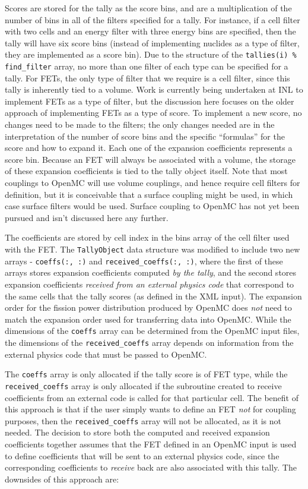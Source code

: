 \documentclass[10pt]{article}
\numberwithin{equation}{section} %
\begin{document}
Scores are stored for the tally as the score bins, and are a multiplication of the number of bins in all of the filters specified for a tally. For instance, if a cell filter with two cells and an energy filter with three energy bins are specified, then the tally will have six score bins (instead of implementing nuclides as a type of filter, they are implemented as a score bin). Due to the structure of the {\tt tallies(i) \% find\_filter} array, no more than one filter of each type can be specified for a tally. For FETs, the only type of filter that we require is a cell filter, since this tally is inherently tied to a volume. Work is currently being undertaken at INL to implement FETs as a type of filter, but the discussion here focuses on the older approach of implementing FETs as a type of score. To implement a new score, no changes need to be made to the filters; the only changes needed are in the interpretation of the number of score bins and the specific ``formulas'' for the score and how to expand it. Each one of the expansion coefficients represents a score bin. Because an FET will always be associated with a volume, the storage of these expansion coefficients is tied to the tally object itself. Note that most couplings to OpenMC will use volume couplings, and hence require cell filters for definition, but it is conceivable that a surface coupling might be used, in which case surface filters would be used. Surface coupling to OpenMC has not yet been pursued and isn't discussed here any further.
 
The coefficients are stored by cell index in the bins array of the cell filter used with the FET. The {\tt TallyObject} data structure was modified to include two new arrays - {\tt coeffs(:, :)} and {\tt received\_coeffs(:, :)}, where the first of these arrays stores expansion coefficients computed {\it by the tally}, and the second stores expansion coefficients {\it received from an external physics code} that correspond to the same cells that the tally scores (as defined in the XML input). The expansion order for the fission power distribution produced by OpenMC does {\it not} need to match the expansion order used for transferring data into OpenMC. While the dimensions of the {\tt coeffs} array can be determined from the OpenMC input files, the dimensions of the {\tt received\_coeffs} array depends on information from the external physics code that must be passed to OpenMC.

The {\tt coeffs} array is only allocated if the tally score is of FET type, while the {\tt received\_coeffs} array is only allocated if the subroutine created to receive coefficients from an external code is called for that particular cell. The benefit of this approach is that if the user simply wants to define an FET {\it not} for coupling purposes, then the {\tt received\_coeffs} array will not be allocated, as it is not needed. The decision to store both the computed and received expansion coefficients together assumes that the FET defined in an OpenMC input is used to define coefficients that will be sent to an external physics code, since the corresponding coefficients to {\it receive} back are also associated with this tally. The downsides of this approach are:
\end{document}
